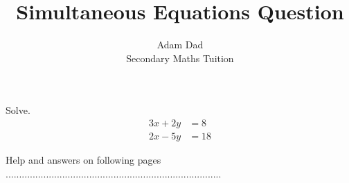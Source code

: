 \documentclass[12pt]{article}
\newenvironment{question}[2][Question]{\begin{trivlist}
\item[\hskip \labelsep {\bfseries #1}\hskip \labelsep {\bfseries #2.}]}{\end{trivlist}}
\begin{document}
 
 
\title{Simultaneous Equations Question}%
\author{Adam Dad\\ %
Secondary Maths Tuition} %
 
\maketitle
 
\begin{question} 
1
Solve.
\begin{align*}
    3x + 2y &= 8 \\
    2x - 5y &= 18 
\end{align*}
\end{question}
Help and answers on following pages ................................................................................
\clearpage
\end{document}
